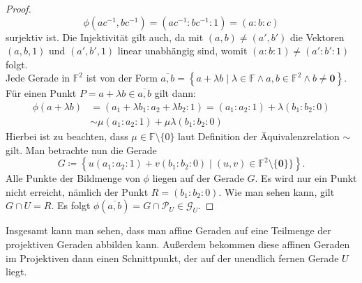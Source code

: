 \documentclass[hidelinks]{article}
\theoremstyle{plain}
\theoremstyle{definition}
\theoremstyle{rem}
\newcommand{\fnz}{\mathbb{F}\setminus\{0\}}
\newcommand{\ftwnz}{\mathbb{F}^{2}\setminus\{\boldsymbol 0\}}
\newcommand{\pu}{\mathcal{P}_U}
\newcommand{\gu}{\mathcal{G}_U}
\begin{document}
\begin{sloppypar}
\begin{proof}
\begin{equation*}
        \phi(ac^{-1},bc^{-1}) = (ac^{-1}:bc^{-1}:1) = (a:b:c)
    \end{equation*}
    surjektiv ist. Die Injektivität gilt auch, da mit $(a,b) \neq (a',b')$ die Vektoren $(a,b,1)$ und $(a',b',1)$ linear unabhängig sind, womit $(a:b:1) \neq (a':b':1)$ folgt. \\
    \newline
    Jede Gerade in $\mathbb{F}^2$ ist von der Form $\overline{a,b} = \left\{ a + \lambda b \mid \lambda \in \mathbb{F}\land a,b \in \mathbb{F}^2 \land b \neq \boldsymbol 0 \right\}$. Für einen Punkt $P = a + \lambda b \in \overline{a,b}$ gilt dann:
    \begin{equation*}
        \begin{aligned}
            \phi(a + \lambda b) & = (a_1 + \lambda b_1 : a_2 + \lambda b_2 : 1) = (a_1 : a_2 : 1) + \lambda (b_1 : b_2 : 0) \\
            & \sim \mu (a_1 : a_2 : 1) + \mu \lambda (b_1 : b_2 : 0)
        \end{aligned}
    \end{equation*}
    Hierbei ist zu beachten, dass $\mu \in \fnz$ laut Definition der Äquivalenzrelation $\sim$ gilt. Man betrachte nun die Gerade
    \begin{equation*}
        G \coloneqq \left\{ u(a_1 : a_2 : 1) + v(b_1 : b_2 : 0) \mid (u,v) \in \ftwnz\} \right\}.
    \end{equation*}
    Alle Punkte der Bildmenge von $\phi$ liegen auf der Gerade $G$. Es wird nur ein Punkt nicht erreicht, nämlich der Punkt $R = (b_1 : b_2 : 0)$. Wie man sehen kann, gilt $G \cap U = R$. Es folgt $\phi(\overline{a,b}) = G \cap \pu \in \gu$.
\end{proof}
Insgesamt kann man sehen, dass man affine Geraden auf eine Teilmenge der projektiven Geraden abbilden kann. Außerdem bekommen diese affinen Geraden im Projektiven dann einen Schnittpunkt, der auf der unendlich fernen Gerade $U$ liegt.

\end{sloppypar}
\end{document}
